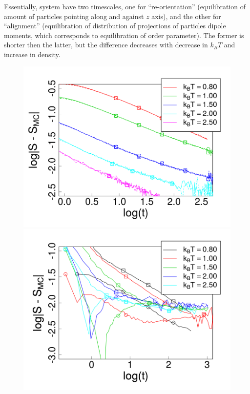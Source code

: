 Essentially, system have two timescales, one for ``re-orientation'' (equilibration of amount of particles pointing along and against $z$ axis), and the other for ``alignment'' (equilibration of distribution of projections of particles dipole moments, which corresponds to equilibration of order parameter). The former is shorter then the latter, but the difference decreases with decrease in $k_BT$ and increase in density.

\begin{figure}[t]
\centering
\begin{minipage}[c]{0.32\textwidth}
	\centering
	\includegraphics[width=\textwidth]{Images/relax_op_25}
\end{minipage}
\begin{minipage}[c]{0.32\textwidth}
	\centering
	\includegraphics[width=\textwidth]{Images/relax_op_75}

\end{minipage}
\end{figure}
